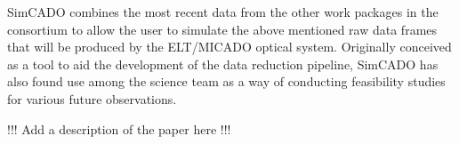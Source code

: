 SimCADO combines the most recent data from the other work packages in the consortium to allow the user to simulate the above mentioned raw data frames that will be produced by the ELT/MICADO optical system. Originally conceived as a tool to aid the development of the data reduction pipeline, SimCADO has also found use among the science team as a way of conducting feasibility studies for various future observations.


!!! Add a description of the paper here !!!